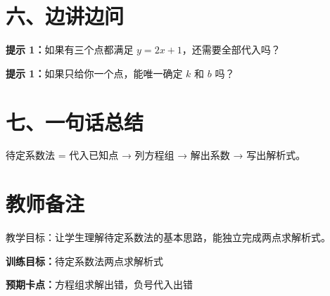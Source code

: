 \documentclass{exam-zh}
\begin{document}
\section*{六、边讲边问}


\begin{hintbox}
  \textbf{提示 1：}如果有三个点都满足 $y=2x+1$，还需要全部代入吗？
\end{hintbox}




\begin{hintbox}
  \textbf{提示 1：}如果只给你一个点，能唯一确定 $k$ 和 $b$ 吗？
\end{hintbox}



\section*{七、一句话总结}


\begin{keyideabox}
  待定系数法 = 代入已知点 → 列方程组 → 解出系数 → 写出解析式。
\end{keyideabox}



\clearpage
\section*{教师备注}


\begin{keyideabox}
  教学目标：让学生理解待定系数法的基本思路，能独立完成两点求解析式。
\end{keyideabox}


\begin{teachernote}
  \textbf{训练目标：}待定系数法两点求解析式\par
  \textbf{预期卡点：}方程组求解出错，负号代入出错
\end{teachernote}
\end{document}

